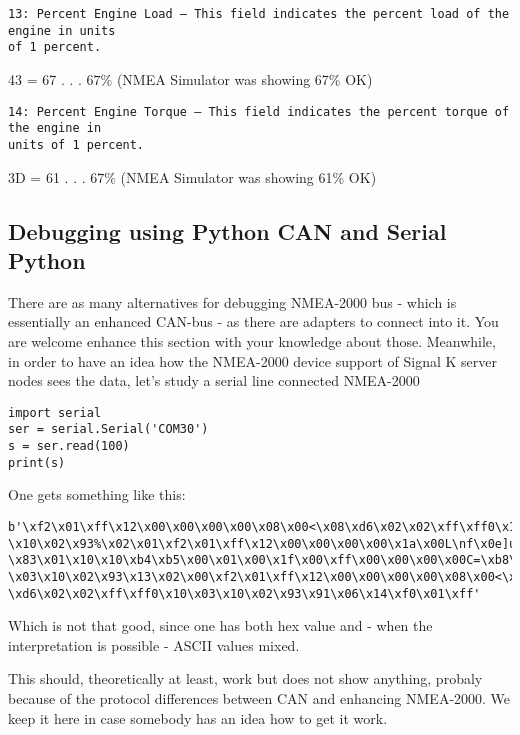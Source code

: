 \documentclass[11pt]{article}
\begin{document}
\begin{verbatim}
13: Percent Engine Load – This field indicates the percent load of the engine in units
of 1 percent.
\end{verbatim}

43 = 67 . . . \(67\%\) (NMEA Simulator was showing 67\% OK)

    \begin{verbatim}
14: Percent Engine Torque – This field indicates the percent torque of the engine in
units of 1 percent. 
\end{verbatim}

3D = 61 . . . \(67\%\) (NMEA Simulator was showing 61\% OK)

    \hypertarget{debugging-using-python-can-and-serial-python}{%
\subsection{Debugging using Python CAN and Serial
Python}\label{debugging-using-python-can-and-serial-python}}

    There are as many alternatives for debugging NMEA-2000 bus - which is
essentially an enhanced CAN-bus - as there are adapters to connect into
it. You are welcome enhance this section with your knowledge about
those. Meanwhile, in order to have an idea how the NMEA-2000 device
support of Signal K server nodes sees the data, let's study a serial
line connected NMEA-2000

    \begin{verbatim}
import serial
ser = serial.Serial('COM30')
s = ser.read(100)
print(s)
\end{verbatim}

    One gets something like this:

\begin{verbatim}
b'\xf2\x01\xff\x12\x00\x00\x00\x00\x08\x00<\x08\xd6\x02\x02\xff\xff0\x10\x03
\x10\x02\x93%\x02\x01\xf2\x01\xff\x12\x00\x00\x00\x00\x1a\x00L\nf\x0e]u2\x05
\x83\x01\x10\x10\xb4\xb5\x00\x01\x00\x1f\x00\xff\x00\x00\x00\x00C=\xb8\x10
\x03\x10\x02\x93\x13\x02\x00\xf2\x01\xff\x12\x00\x00\x00\x00\x08\x00<\x08
\xd6\x02\x02\xff\xff0\x10\x03\x10\x02\x93\x91\x06\x14\xf0\x01\xff'
\end{verbatim}

Which is not that good, since one has both hex value and - when the
interpretation is possible - ASCII values mixed.

    This should, theoretically at least, work but does not show anything,
probaly because of the protocol differences between CAN and enhancing
NMEA-2000. We keep it here in case somebody has an idea how to get it
work.
\end{document}
